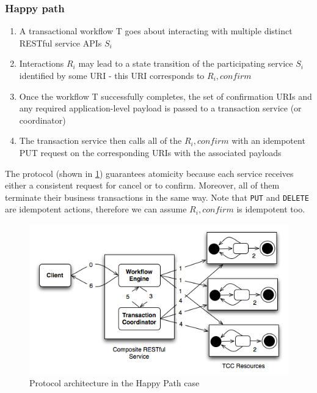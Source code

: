 \subsubsection{Happy path}
\begin{enumerate}
\item A transactional workflow T goes about interacting with multiple distinct RESTful service APIs $S_i$
\item Interactions $R_i$ may lead to a state transition of the participating service $S_i$ identified by some URI - this URI corresponds to $R_i,confirm$
\item Once the workflow T successfully completes, the set of confirmation URIs and any required application-level payload is passed to a transaction service (or coordinator)
\item The transaction service then calls all of the $R_i,confirm$ with an idempotent PUT request on the corresponding URIs with the associated payloads
\end{enumerate}

The protocol (shown in \ref{tcc-overview}) guarantees atomicity because each service receives either a consistent request for cancel or to confirm. Moreover, all of them terminate their business transactions in the same way. Note that {\tt PUT} and {\tt DELETE} are idempotent actions, therefore we can assume $R_i,confirm$ is idempotent too. 

\begin{figure} [ht]
\centering
\includegraphics[scale=0.75]{images/TCC_overview.jpg}
\caption{Protocol architecture in the Happy Path case}
\label{tcc-overview}
\end{figure}

